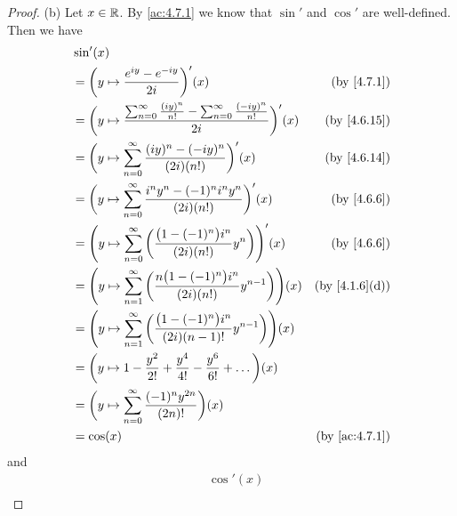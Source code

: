 \begin{proof}{(b)}
  Let \(x \in \mathbb{R}\).
  By \cref{ac:4.7.1} we know that \(\sin'\) and \(\cos'\) are well-defined.
  Then we have
  \begin{align*}
     & \sin'(x)                                                                                                                                               \\
     & = \bigg(y \mapsto \frac{e^{i y} - e^{- i y}}{2i}\bigg)'(x)                                                               & \text{(by \cref{4.7.1})}    \\
     & = \bigg(y \mapsto \frac{\sum_{n = 0}^\infty \frac{(i y)^n}{n!} - \sum_{n = 0}^\infty \frac{(- i y)^n}{n!}}{2i}\bigg)'(x) & \text{(by \cref{4.6.15})}   \\
     & = \bigg(y \mapsto \sum_{n = 0}^\infty \frac{(i y)^n - (- i y)^n}{(2i) (n!)}\bigg)'(x)                                    & \text{(by \cref{4.6.14})}   \\
     & = \bigg(y \mapsto \sum_{n = 0}^\infty \frac{i^n y^n - (-1)^n i^n y^n}{(2i) (n!)}\bigg)'(x)                               & \text{(by \cref{4.6.6})}    \\
     & = \Bigg(y \mapsto \sum_{n = 0}^\infty \bigg(\frac{\big(1 - (-1)^n\big) i^n}{(2i) (n!)} y^n\bigg)\Bigg)'(x)               & \text{(by \cref{4.6.6})}    \\
     & = \Bigg(y \mapsto \sum_{n = 1}^\infty \bigg(\frac{n \big(1 - (-1)^n\big) i^n}{(2i) (n!)} y^{n - 1}\bigg)\Bigg)(x)        & \text{(by \cref{4.1.6}(d))} \\
     & = \Bigg(y \mapsto \sum_{n = 1}^\infty \bigg(\frac{\big(1 - (-1)^n\big) i^n}{(2i) (n - 1)!} y^{n - 1}\bigg)\Bigg)(x)                                    \\
     & = \bigg(y \mapsto 1 - \frac{y^2}{2!} + \frac{y^4}{4!} - \frac{y^6}{6!} + \dots\bigg)(x)                                                                \\
     & = \bigg(y \mapsto \sum_{n = 0}^\infty \frac{(-1)^n y^{2n}}{(2n)!}\bigg)(x)                                                                             \\
     & = \cos(x)                                                                                                                & \text{(by \cref{ac:4.7.1})}
  \end{align*}
  and
  \begin{align*}
     & \cos'(x)                                                                                                                                              \\

\end{align*}
\end{proof}
